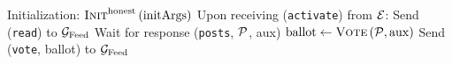 \begin{algorithm}[H]
  \caption{$\honeststr\left(\textsc{Init}^{\honest},
  \textsc{Vote}\right)\left(\mathrm{initArgs}\right)$}
  \label{alg:honest}
  \begin{algorithmic}[1]
    \State Initialization:
    \Indent
      \State $\textsc{Init}^{\mathrm{honest}}\left(\mathrm{initArgs}\right)$
    \EndIndent
    \State
    \State Upon receiving (\texttt{activate}) from $\mathcal{E}$:
    \Indent
      \State Send (\texttt{read}) to $\mathcal{G}_{\mathrm{Feed}}$
      \State Wait for response (\texttt{posts}, $\mathcal{P}$, aux)
      \State $\mathrm{ballot} \gets \textsc{Vote}\left(\mathcal{P},
      \mathrm{aux}\right)$
      \State Send (\texttt{vote}, ballot) to $\mathcal{G}_{\mathrm{Feed}}$
    \EndIndent
  \end{algorithmic}
\end{algorithm}
